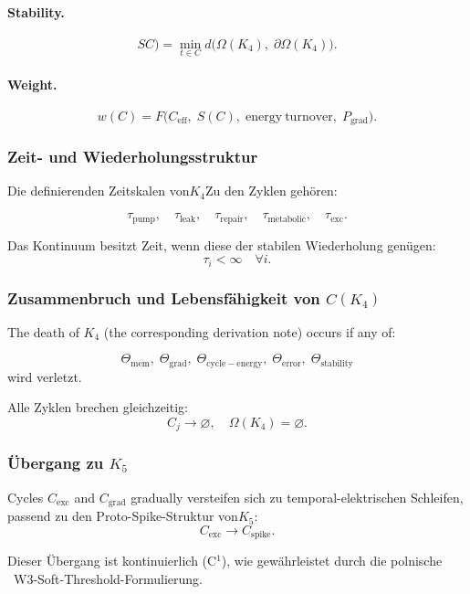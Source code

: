\paragraph{Stability.}
\[
SC)
   = \min_{t\in C}
       d\bigl(
         \Omega(K_4),\;
         \partial\Omega(K_4)
       \bigr).
\]

\paragraph{Weight.}
\[
  w(C)=F\bigl(
        C_{\mathrm{eff}},\;
        S(C),\;
        \mathrm{energy\ turnover},\;
        P_{\mathrm{grad}}
      \bigr).
\]

\subsubsection{Zeit- und Wiederholungsstruktur}

Die definierenden Zeitskalen von$K_4$Zu den Zyklen gehören:

\[
  \tau_{\mathrm{pump}},\quad
  \tau_{\mathrm{leak}},\quad
  \tau_{\mathrm{repair}},\quad
  \tau_{\mathrm{metabolic}},\quad
  \tau_{\mathrm{exc}}.
\]

Das Kontinuum besitzt Zeit, wenn diese der stabilen Wiederholung genügen:
\[
  \tau_i<\infty \quad\forall i.
\]

\subsubsection{Zusammenbruch und Lebensfähigkeit von \texorpdfstring{$C(K_4)$}{C(K_4)}}

The death of $K_4$ (the corresponding derivation note) occurs if any of:

\[
  \Theta_{\mathrm{mem}},\;
  \Theta_{\mathrm{grad}},\;
  \Theta_{\mathrm{cycle-energy}},\;
  \Theta_{\mathrm{error}},\;
  \Theta_{\mathrm{stability}}
\]
wird verletzt.

Alle Zyklen brechen gleichzeitig:
\[
  C_j \to \varnothing,
\quad
  \Omega(K_4)=\varnothing.
\]

\subsubsection{Übergang zu \texorpdfstring{$K_5$}{K_5}}

Cycles $C_{\mathrm{exc}}$ and $C_{\mathrm{grad}}$ gradually 
versteifen sich zu temporal-elektrischen Schleifen, passend zu den
Proto-Spike-Struktur von$K_5$:
\[
  C_{\mathrm{exc}}\longrightarrow C_{\mathrm{spike}}.
\]

Dieser Übergang ist kontinuierlich (C$^1$), wie gewährleistet durch
die polnische ~W3-Soft-Threshold-Formulierung.
